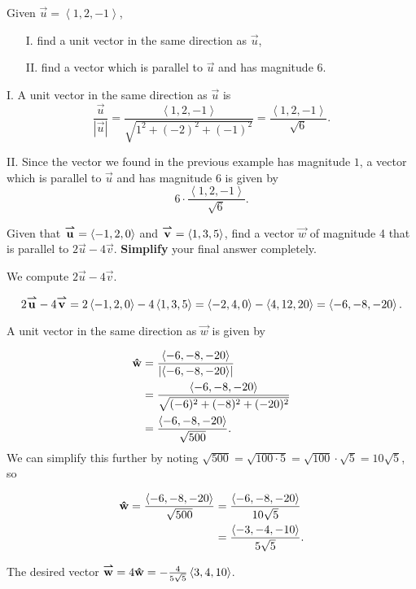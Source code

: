 \documentclass[handout,noauthor]{ximera}
\begin{document}
\begin{problem}
Given $\vec{u} = \left<1,2,-1\right>$,
\begin{itemize}
\item[I.] find a unit vector in the same direction as $\vec{u}$,
\item[II.] find a vector which is parallel to $\vec{u}$ and has magnitude $6$.
\end{itemize}
\begin{freeResponse}
I. A unit vector in the same direction as $\vec{u}$ is 
$$
\frac{\vec{u}}{\left|\vec{u}\right|} = \frac{\left<1,2,-1\right>}{\sqrt{1^2 + (-2)^2 + (-1)^2}} = \frac{\left<1,2,-1\right>}{\sqrt{6}}.
$$

II. Since the vector we found in the previous example has magnitude $1$, a vector which is parallel to $\vec{u}$ and has magnitude $6$ is given by
$$
6 \cdot \frac{\left<1,2,-1\right>}{\sqrt{6}}.
$$
\end{freeResponse}
\end{problem}
\begin{problem}
Given that ${\overset{\boldsymbol{\rightharpoonup}}{\mathbf{u}}} = \left\langle -1,2,0\right\rangle$ and ${\overset{\boldsymbol{\rightharpoonup}}{\mathbf{v}}}=\left\langle 1,3,5\right\rangle$, find a vector $\vec{w}$ of magnitude 4 that is parallel to $2\vec{u}-4\vec{v}$.  \textbf{Simplify} your final answer completely.

\begin{freeResponse}
We compute $2\vec{u}-4\vec{v}$.

\[
2{\overset{\boldsymbol{\rightharpoonup}}{\mathbf{u}}}-4{\overset{\boldsymbol{\rightharpoonup}}{\mathbf{v}}} = 2\left\langle -1,2,0\right\rangle -4\left\langle 1,3,5\right\rangle = \left\langle -2,4,0\right\rangle -\left\langle 4,12,20\right\rangle=\left\langle -6,-8,-20\right\rangle.
\]

A unit vector in the same direction as $\vec{w}$ is given by

\begin{align*}
\mathbf{\hat{w}} &= \frac{\left\langle -6,-8,-20\right\rangle}{\left|\left\langle -6,-8,-20\right\rangle\right|} \\
&=  \frac{\left\langle -6,-8,-20\right\rangle}{\sqrt{(-6)^2+(-8)^2+(-20)^2}} \\
&=  \frac{\left\langle -6,-8,-20\right\rangle}{\sqrt{500}}.
\end{align*}
We can simplify this further by noting $\sqrt{500} = \sqrt{100 \cdot 5} = \sqrt{100} \cdot \sqrt{5} =10\sqrt{5}$, so 

\begin{align*}
\mathbf{\hat{w}} = \frac{\left\langle -6,-8,-20\right\rangle}{\sqrt{500}} &=  \frac{\left\langle -6,-8,-20\right\rangle}{10 \sqrt{5}} \\
&=  \frac{\left\langle -3,-4,-10\right\rangle}{5 \sqrt{5}} .
\end{align*}

The desired vector ${\overset{\boldsymbol{\rightharpoonup}}{\mathbf{w}}} = 4 \mathbf{\hat{w}} =  -\frac{4}{5 \sqrt{5}}\left\langle 3,4,10\right\rangle$.

\end{freeResponse}
\end{problem}
\end{document}
